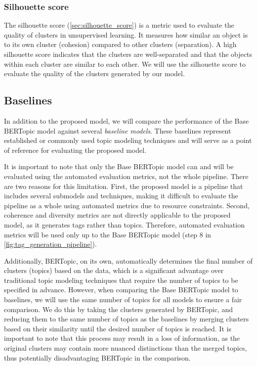 \subsubsection{Silhouette score}
The silhouette score (\cref{sec:silhouette_score}) is a metric used to evaluate the quality of clusters in unsupervised learning. It measures how similar an object is to its own cluster (cohesion) compared to other clusters (separation). A high silhouette score indicates that the clusters are well-separated and that the objects within each cluster are similar to each other. We will use the silhouette score to evaluate the quality of the clusters generated by our model.

\subsection{Baselines}
In addition to the proposed model, we will compare the performance of the Base BERTopic model against several \textit{baseline models}. These baselines represent established or commonly used topic modeling techniques and will serve as a point of reference for evaluating the proposed model. 

It is important to note that only the Base BERTopic model can and will be evaluated using the automated evaluation metrics, not the whole pipeline. There are two reasons for this limitation. First, the proposed model is a pipeline that includes several submodels and techniques, making it difficult to evaluate the pipeline as a whole using automated metrics due to resource constraints. Second, coherence and diversity metrics are not directly applicable to the proposed model, as it generates tags rather than topics. Therefore, automated evaluation metrics will be used only up to the Base BERTopic model (step 8 in \cref{fig:tag_generation_pipeline}).

Additionally, BERTopic, on its own, automatically determines the final number of clusters (topics) based on the data, which is a significant advantage over traditional topic modeling techniques that require the number of topics to be specified in advance. However, when comparing the Base BERTopic model to baselines, we will use the same number of topics for all models to ensure a fair comparison. We do this by taking the clusters generated by BERTopic, and reducing them to the same number of topics as the baselines by merging clusters based on their similarity until the desired number of topics is reached. It is important to note that this process may result in a loss of information, as the original clusters may contain more nuanced distinctions than the merged topics, thus potentially disadvantaging BERTopic in the comparison.

